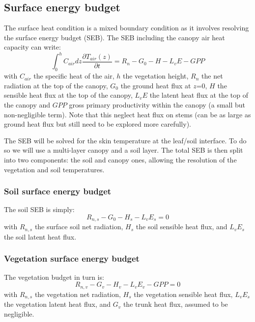 \documentclass{report}
\begin{document}
\subsection{Surface energy budget}
The surface heat condition is a mixed boundary condition as it involves resolving the surface energy budget (SEB). The SEB including the canopy air heat capacity can write:
\begin{equation}
    \int_0^h{C_{air}dz \frac{\partial T_{air}(z)}{\partial t}} = R_n - G_0 - H - L_vE - GPP 
\end{equation}
with $C_{air}$ the specific heat of the air, $h$ the vegetation height, $R_n$ the net radiation at the top of the canopy, $G_0$ the ground heat flux at $z$=0, $H$ the sensible heat flux at the top of the canopy, $L_vE$ the latent heat flux at the top of the canopy and $GPP$ gross primary productivity within the canopy (a small but non-negligible term). Note that this neglect heat flux on stems (can be as large as ground heat flux but still need to be explored more carefully).

 The SEB will be solved for the skin temperature at the leaf/soil interface. To do so we will use a multi-layer canopy and a soil layer.
 The total SEB is then split into two components: the soil and canopy ones, allowing the resolution of the vegetation and soil temperatures.
 
\subsubsection{Soil surface energy budget}
The soil SEB is simply:
\begin{equation}
     R_{n,s} - G_0 - H_s - L_vE_s = 0  
     \label{SEB:soil}
\end{equation}
with $R_{n,s}$ the surface soil net radiation, $H_s$ the soil sensible heat flux, and $L_vE_s$ the soil latent heat flux.

\subsubsection{Vegetation surface energy budget}
The vegetation budget in turn is:
\begin{equation}
     R_{n,v} - G_v - H_v - L_vE_v - GPP = 0  
     \label{SEB:veg}
\end{equation}
with $R_{n,s}$ the vegetation net radiation, $H_s$ the vegetation sensible heat flux, $L_vE_s$ the vegetation latent heat flux, and $G_v$ the trunk heat flux, assumed to be negligible. 
\end{document}
